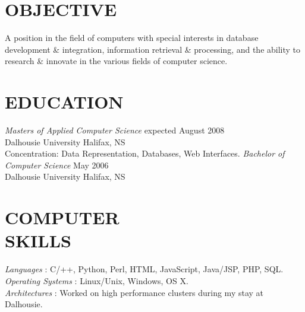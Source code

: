 \documentclass[line,margin]{res}
\begin{document}
\address{3139 Veith St., Halifax, NS B3K 3G9}
\address{(902) 489-2557 or (902) 444-4974}

 
\begin{resume}
 
\section{OBJECTIVE}       
    A position in the field of computers with special 
    interests in database development {\&} integration, 
    information retrieval {\&} processing, and the ability to
    research {\&} innovate in the various fields of computer
    science.
 
 
\section{EDUCATION} 
    {\sl Masters of Applied Computer Science} \hfill expected August 2008\\
        Dalhousie University \hfill Halifax, NS\\
        Concentration: Data Representation, Databases, 
        Web Interfaces.  \medskip 
    \newline 
    {\sl Bachelor of Computer Science} \hfill May 2006\\
        Dalhousie University \hfill Halifax, NS 
 
 
\section{COMPUTER \\ SKILLS} 
    {\sl Languages \hspace{35pt}}:
     C/++, Python, Perl, HTML, JavaScript, Java/JSP, PHP, SQL.\\
    {\sl Operating Systems }:
     Linux/Unix, Windows, OS X. \\
    {\sl Architectures \hspace{27pt}}: 
     Worked on high performance clusters during my stay at \\
     \hspace*{92pt} Dalhousie. 



\end{resume}
\end{document}
